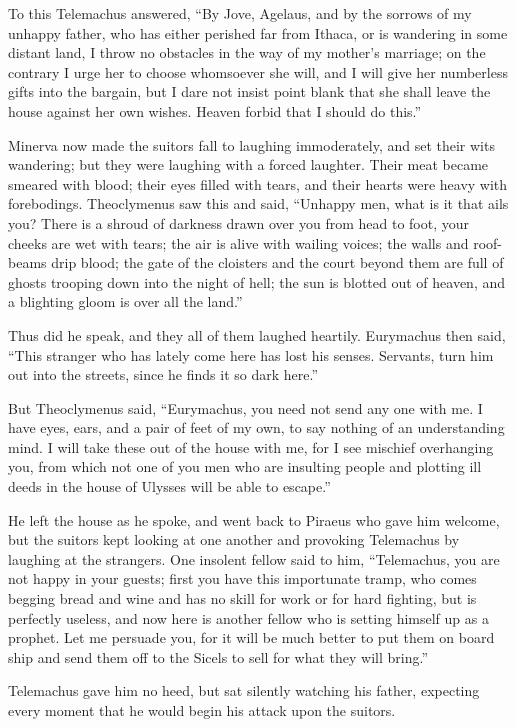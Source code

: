 To this Telemachus answered, “By Jove, Agelaus, and by the sorrows of my
unhappy father, who has either perished far from Ithaca, or is wandering in
some distant land, I throw no obstacles in the way of my mother’s marriage; on
the contrary I urge her to choose whomsoever she will, and I will give her
numberless gifts into the bargain, but I dare not insist point blank that she
shall leave the house against her own wishes. Heaven forbid that I should do
this.”

Minerva now made the suitors fall to laughing immoderately, and set their wits
wandering; but they were laughing with a forced laughter. Their meat became
smeared with blood; their eyes filled with tears, and their hearts were heavy
with forebodings. Theoclymenus saw this and said, “Unhappy men, what is it that
ails you? There is a shroud of darkness drawn over you from head to foot, your
cheeks are wet with tears; the air is alive with wailing voices; the walls and
roof-beams drip blood; the gate of the cloisters and the court beyond them are
full of ghosts trooping down into the night of hell; the sun is blotted out of
heaven, and a blighting gloom is over all the land.”

Thus did he speak, and they all of them laughed heartily. Eurymachus then said,
“This stranger who has lately come here has lost his senses. Servants, turn him
out into the streets, since he finds it so dark here.”

But Theoclymenus said, “Eurymachus, you need not send any one with me. I have
eyes, ears, and a pair of feet of my own, to say nothing of an understanding
mind. I will take these out of the house with me, for I see mischief
overhanging you, from which not one of you men who are insulting people and
plotting ill deeds in the house of Ulysses will be able to escape.”

He left the house as he spoke, and went back to Piraeus who gave him welcome,
but the suitors kept looking at one another and provoking Telemachus by
laughing at the strangers. One insolent fellow said to him, “Telemachus, you
are not happy in your guests; first you have this importunate tramp, who comes
begging bread and wine and has no skill for work or for hard fighting, but is
perfectly useless, and now here is another fellow who is setting himself up as
a prophet. Let me persuade you, for it will be much better to put them on board
ship and send them off to the Sicels to sell for what they will bring.”

Telemachus gave him no heed, but sat silently watching his father, expecting
every moment that he would begin his attack upon the suitors.

